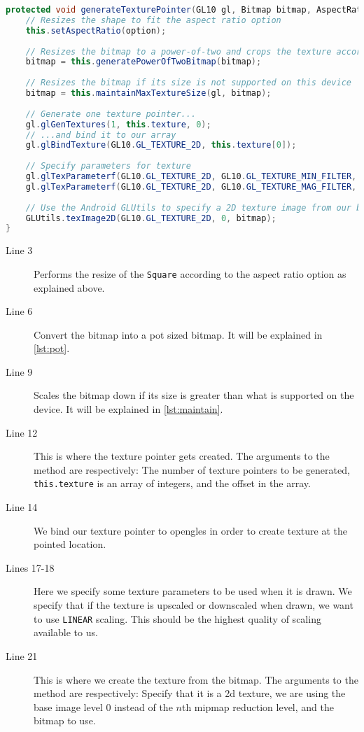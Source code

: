 \begin{lstlisting}[language=java,caption={Generates an \ac{opengles} texture pointer.},label=lst:texturepointer] 
protected void generateTexturePointer(GL10 gl, Bitmap bitmap, AspectRatio option) {
    // Resizes the shape to fit the aspect ratio option
    this.setAspectRatio(option);
    
    // Resizes the bitmap to a power-of-two and crops the texture accordingly
    bitmap = this.generatePowerOfTwoBitmap(bitmap);
    
    // Resizes the bitmap if its size is not supported on this device
    bitmap = this.maintainMaxTextureSize(gl, bitmap);
    
    // Generate one texture pointer...
    gl.glGenTextures(1, this.texture, 0);
    // ...and bind it to our array
    gl.glBindTexture(GL10.GL_TEXTURE_2D, this.texture[0]);
    
    // Specify parameters for texture
    gl.glTexParameterf(GL10.GL_TEXTURE_2D, GL10.GL_TEXTURE_MIN_FILTER, GL10.GL_LINEAR);
    gl.glTexParameterf(GL10.GL_TEXTURE_2D, GL10.GL_TEXTURE_MAG_FILTER, GL10.GL_LINEAR);
    
    // Use the Android GLUtils to specify a 2D texture image from our bitmap
    GLUtils.texImage2D(GL10.GL_TEXTURE_2D, 0, bitmap);
}
\end{lstlisting}

\begin{description}
\item[Line 3] Performs the resize of the \lstinline|Square| according to the aspect ratio option as explained above.
\item[Line 6] Convert the bitmap into a \ac{pot} sized bitmap. It will be explained in \autoref{lst:pot}.
\item[Line 9] Scales the bitmap down if its size is greater than what is supported on the device. It will be explained in \autoref{lst:maintain}.
\item[Line 12] This is where the texture pointer gets created. The arguments to the method are respectively: The number of texture pointers to be generated, \lstinline|this.texture| is an array of integers, and the offset in the array.
\item[Line 14] We bind our texture pointer to \ac{opengles} in order to create texture at the pointed location.
\item[Lines 17-18] Here we specify some texture parameters to be used when it is drawn. We specify that if the texture is upscaled or downscaled when drawn, we want to use \lstinline|LINEAR| scaling. This should be the highest quality of scaling available to us.
\item[Line 21] This is where we create the texture from the bitmap. The arguments to the method are respectively: Specify that it is a \ac{2d} texture, we are using the base image level $0$ instead of the $n$th mipmap reduction level, and the bitmap to use.
\end{description}

